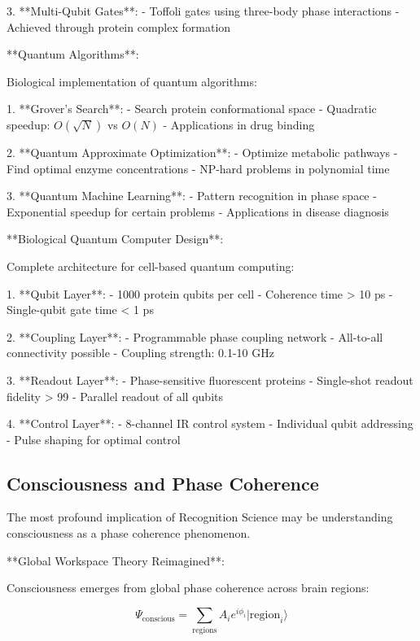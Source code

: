 \documentclass[12pt,a4paper]{report}
\begin{document}
3. **Multi-Qubit Gates**:
   - Toffoli gates using three-body phase interactions
   - Achieved through protein complex formation

**Quantum Algorithms**:

Biological implementation of quantum algorithms:

1. **Grover's Search**:
   - Search protein conformational space
   - Quadratic speedup: $O(\sqrt{N})$ vs $O(N)$
   - Applications in drug binding

2. **Quantum Approximate Optimization**:
   - Optimize metabolic pathways
   - Find optimal enzyme concentrations
   - NP-hard problems in polynomial time

3. **Quantum Machine Learning**:
   - Pattern recognition in phase space
   - Exponential speedup for certain problems
   - Applications in disease diagnosis

**Biological Quantum Computer Design**:

Complete architecture for cell-based quantum computing:

1. **Qubit Layer**:
   - 1000 protein qubits per cell
   - Coherence time > 10 ps
   - Single-qubit gate time < 1 ps

2. **Coupling Layer**:
   - Programmable phase coupling network
   - All-to-all connectivity possible
   - Coupling strength: 0.1-10 GHz

3. **Readout Layer**:
   - Phase-sensitive fluorescent proteins
   - Single-shot readout fidelity > 99%
   - Parallel readout of all qubits

4. **Control Layer**:
   - 8-channel IR control system
   - Individual qubit addressing
   - Pulse shaping for optimal control

\subsection{Consciousness and Phase Coherence}

The most profound implication of Recognition Science may be understanding consciousness as a phase coherence phenomenon.

**Global Workspace Theory Reimagined**:

Consciousness emerges from global phase coherence across brain regions:

\begin{equation}
\Psi_{\text{conscious}} = \sum_{\text{regions}} A_i e^{i\phi_i} |\text{region}_i\rangle
\end{equation}
\end{document}
